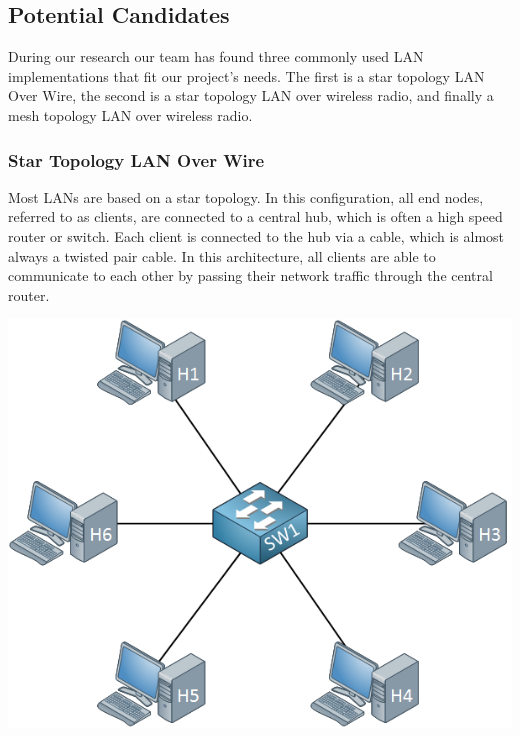 \documentclass[onecolumn, draftclsnofoot,10pt, compsoc]{IEEEtran}
\begin{document}
		\subsection{Potential Candidates}
		During our research our team has found three commonly used LAN implementations that fit our project's needs.
		The first is a star topology LAN Over Wire, the second is a star topology LAN over wireless radio, and finally a mesh topology LAN over wireless radio.

		\subsubsection{Star Topology LAN Over Wire}
		Most LANs are based on a star topology.  In this configuration, all end nodes, referred to as clients, are connected to a central hub, which is often a high speed router or switch.
		Each client is connected to the hub via a cable, which is almost always a twisted pair cable.\cite{LAN2}
		In this architecture, all clients are able to communicate to each other by passing their network traffic through the central router.

		\begin{center}
			\includegraphics[scale=0.5]{switch-star-topology-hosts.png}
		\end{center} \cite{IMG1}

		\newpage %
\end{document}
